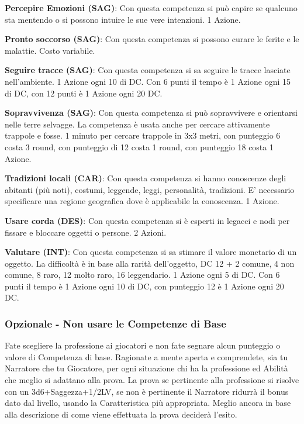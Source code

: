 \begin{multicols}{2}
\textbf{Percepire Emozioni (SAG)}: Con questa competenza si può capire se qualcuno sta mentendo o si possono intuire le sue vere intenzioni. 1 Azione.

\textbf{Pronto soccorso (SAG)}: Con questa competenza si possono curare le ferite e le malattie. Costo variabile.

\textbf{Seguire tracce (SAG)}: Con questa competenza si sa seguire le tracce lasciate nell'ambiente. 1 Azione ogni 10 di DC. Con 6 punti il tempo è 1 Azione ogni 15 di DC, con 12 punti è 1 Azione ogni 20 DC.

\textbf{Sopravvivenza (SAG)}: Con questa competenza si può sopravvivere e orientarsi nelle terre selvagge. La competenza è usata anche per cercare attivamente trappole e fosse. 1 minuto per cercare trappole in 3x3 metri, con punteggio 6 costa 3 round, con punteggio di 12 costa 1 round, con punteggio 18 costa 1 Azione.

\textbf{Tradizioni locali (CAR)}: Con questa competenza si hanno conoscenze degli abitanti (più noti), costumi, leggende, leggi, personalità, tradizioni. E' necessario specificare una regione geografica dove è applicabile la conoscenza. 1 Azione.

\textbf{Usare corda (DES)}: Con questa competenza si è esperti in legacci e nodi per fissare e bloccare oggetti o persone. 2 Azioni.

\textbf{Valutare (INT)}: Con questa competenza si sa stimare il valore monetario di un oggetto. La difficoltà è in base alla rarità dell'oggetto, DC 12 + 2 comune, 4 non comune, 8 raro, 12 molto raro, 16 leggendario. 1 Azione ogni 5 di DC. Con 6 punti il tempo è 1 Azione ogni 10 di DC, con punteggio 12 è 1 Azione ogni 20 DC. \label{valutare}

\medskip

\subsubsection{Opzionale - Non usare le Competenze di Base}\label{nonusarecompetenze}

Fate scegliere la professione ai giocatori e non fate segnare alcun punteggio o valore di Competenza di base.
Ragionate a mente aperta e comprendete, sia tu Narratore che tu Giocatore, per ogni situazione chi ha la professione ed Abilità che meglio si adattano alla prova.
La prova se pertinente alla professione si risolve con un 3d6+Saggezza+1/2LV, se non è pertinente il Narratore ridurrà il bonus dato dal livello, usando la Caratteristica più appropriata. Meglio ancora in base alla descrizione di come viene effettuata la prova deciderà l'esito.


\end{multicols}
